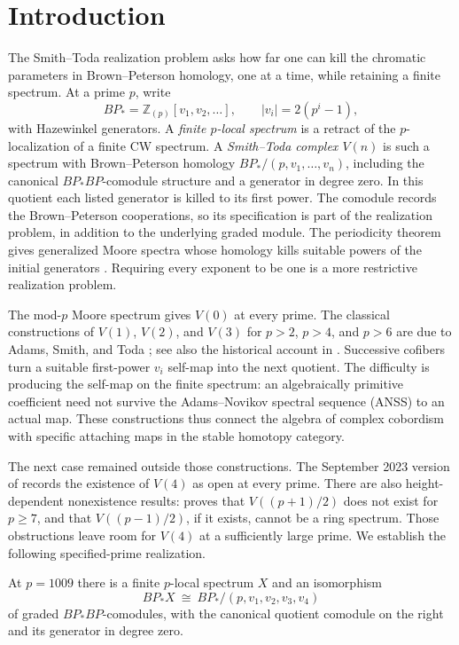 \section{Introduction}\label{intro:section}

The Smith--Toda realization problem asks how far one can kill the chromatic
parameters in Brown--Peterson homology, one at a time, while retaining a finite
spectrum. At a prime $p$, write
\[
 BP_* = \mathbb Z_{(p)}[v_1,v_2,\ldots],
 \qquad |v_i|=2(p^i-1),
\]
with Hazewinkel generators. A \emph{finite $p$-local spectrum} is a retract
of the $p$-localization of a finite CW spectrum. A \emph{Smith--Toda
complex $V(n)$} is such a spectrum with Brown--Peterson homology
$BP_*/(p,v_1,\ldots,v_n)$, including the canonical $BP_*BP$-comodule
structure and a generator in degree zero. In this quotient each listed
generator is killed to its first power. The comodule records the
Brown--Peterson cooperations, so its specification is part of the
realization problem, in addition to the underlying graded module.
The periodicity theorem gives generalized Moore spectra whose homology
kills suitable powers of the initial generators
\citep[Proposition~5.14]{HopkinsSmith1998}. Requiring every exponent
to be one is a more restrictive realization problem.

The mod-$p$ Moore spectrum gives $V(0)$ at every prime. The classical
constructions of $V(1)$, $V(2)$, and $V(3)$ for $p>2$, $p>4$, and $p>6$
are due to Adams, Smith, and Toda
\citep{Adams1966,Smith1970,Toda1971}; see also the historical account in
\citet[p.~493]{Nave2010}. Successive cofibers turn a suitable first-power
$v_i$ self-map into the next quotient. The difficulty is producing the
self-map on the finite spectrum: an algebraically primitive coefficient
need not survive the Adams--Novikov spectral sequence (ANSS) to an actual map.
These constructions thus connect the algebra of complex cobordism with
specific attaching maps in the stable homotopy category.

The next case remained outside those constructions. The September 2023
version of \citet[Remark~3.29]{CulverZhang2024} records the existence of
$V(4)$ as open at every prime. There are also height-dependent
nonexistence results: \citet[Theorem~1.3]{Nave2010} proves that
$V((p+1)/2)$ does not exist for $p\geq7$, and that $V((p-1)/2)$,
if it exists, cannot be a ring spectrum. Those obstructions leave
room for $V(4)$ at a sufficiently large prime.
We establish the following specified-prime realization.

\begin{theorem}\label{intro:main}
At $p=1009$ there is a finite $p$-local spectrum $X$ and an isomorphism
\[
 BP_*X\ \cong\ BP_*/(p,v_1,v_2,v_3,v_4)
\]
of graded $BP_*BP$-comodules, with the canonical quotient comodule on the
right and its generator in degree zero.
\end{theorem}


